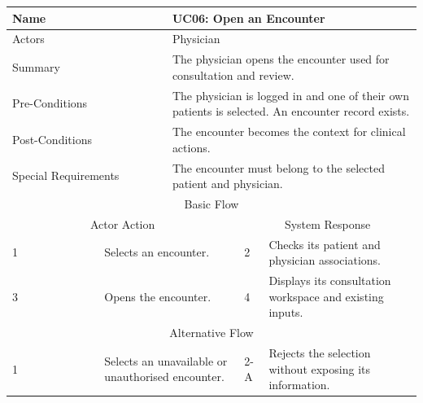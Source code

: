 \begin{reporttable}
\centering
\small
\caption{UC06: Open an Encounter.}
\label{tab:kashaf:uc06}
\begin{tabular}{|p{}|p{}|p{}|p{}|p{}|}
\hline
\multicolumn{2}{|p{\dimexpr0.225\textwidth+2\tabcolsep+\arrayrulewidth\relax}|}{Name} & \multicolumn{3}{p{\dimexpr0.575\textwidth+4\tabcolsep+2\arrayrulewidth\relax}|}{UC06: Open an Encounter} \\ \hline
\multicolumn{2}{|p{\dimexpr0.225\textwidth+2\tabcolsep+\arrayrulewidth\relax}|}{Actors} & \multicolumn{3}{p{\dimexpr0.575\textwidth+4\tabcolsep+2\arrayrulewidth\relax}|}{Physician} \\ \hline
\multicolumn{2}{|p{\dimexpr0.225\textwidth+2\tabcolsep+\arrayrulewidth\relax}|}{Summary} & \multicolumn{3}{p{\dimexpr0.575\textwidth+4\tabcolsep+2\arrayrulewidth\relax}|}{The physician opens the encounter used for consultation and review.} \\ \hline
\multicolumn{2}{|p{\dimexpr0.225\textwidth+2\tabcolsep+\arrayrulewidth\relax}|}{Pre-Conditions} & \multicolumn{3}{p{\dimexpr0.575\textwidth+4\tabcolsep+2\arrayrulewidth\relax}|}{The physician is logged in and one of their own patients is selected. An encounter record exists.} \\ \hline
\multicolumn{2}{|p{\dimexpr0.225\textwidth+2\tabcolsep+\arrayrulewidth\relax}|}{Post-Conditions} & \multicolumn{3}{p{\dimexpr0.575\textwidth+4\tabcolsep+2\arrayrulewidth\relax}|}{The encounter becomes the context for clinical actions.} \\ \hline
\multicolumn{2}{|p{\dimexpr0.225\textwidth+2\tabcolsep+\arrayrulewidth\relax}|}{Special Requirements} & \multicolumn{3}{p{\dimexpr0.575\textwidth+4\tabcolsep+2\arrayrulewidth\relax}|}{The encounter must belong to the selected patient and physician.} \\ \hline
\multicolumn{5}{|c|}{Basic Flow} \\ \hline
\multicolumn{3}{|c|}{Actor Action} & \multicolumn{2}{c|}{System Response} \\ \hline
1 & \multicolumn{2}{p{\dimexpr0.37\textwidth+2\tabcolsep+\arrayrulewidth\relax}|}{Selects an encounter.} & 2 & Checks its patient and physician associations. \\ \hline
3 & \multicolumn{2}{p{\dimexpr0.37\textwidth+2\tabcolsep+\arrayrulewidth\relax}|}{Opens the encounter.} & 4 & Displays its consultation workspace and existing inputs. \\ \hline
\multicolumn{5}{|c|}{Alternative Flow} \\ \hline
1 & \multicolumn{2}{p{\dimexpr0.37\textwidth+2\tabcolsep+\arrayrulewidth\relax}|}{Selects an unavailable or unauthorised encounter.} & 2-A & Rejects the selection without exposing its information. \\ \hline
\end{tabular}
\end{reporttable}

